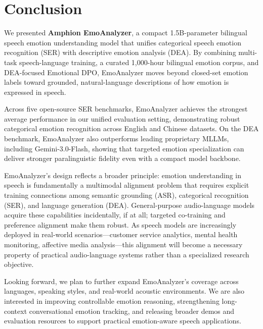 \section{Conclusion}

We presented \textbf{Amphion EmoAnalyzer}, a compact 1.5B-parameter bilingual speech emotion understanding model that unifies categorical speech emotion recognition (SER) with descriptive emotion analysis (DEA). By combining multi-task speech-language training, a curated 1,000-hour bilingual emotion corpus, and DEA-focused Emotional DPO, EmoAnalyzer moves beyond closed-set emotion labels toward grounded, natural-language descriptions of how emotion is expressed in speech.

Across five open-source SER benchmarks, EmoAnalyzer achieves the strongest average performance in our unified evaluation setting, demonstrating robust categorical emotion recognition across English and Chinese datasets. On the DEA benchmark, EmoAnalyzer also outperforms leading proprietary MLLMs, including Gemini-3.0-Flash, showing that targeted emotion specialization can deliver stronger paralinguistic fidelity even with a compact model backbone.

EmoAnalyzer's design reflects a broader principle: emotion understanding in speech is fundamentally a multimodal alignment problem that requires explicit training connections among semantic grounding (ASR), categorical recognition (SER), and language generation (DEA). General-purpose audio-language models acquire these capabilities incidentally, if at all; targeted co-training and preference alignment make them robust. As speech models are increasingly deployed in real-world scenarios---customer service analytics, mental health monitoring, affective media analysis---this alignment will become a necessary property of practical audio-language systems rather than a specialized research objective.

Looking forward, we plan to further expand EmoAnalyzer's coverage across languages, speaking styles, and real-world acoustic environments. We are also interested in improving controllable emotion reasoning, strengthening long-context conversational emotion tracking, and releasing broader demos and evaluation resources to support practical emotion-aware speech applications.
